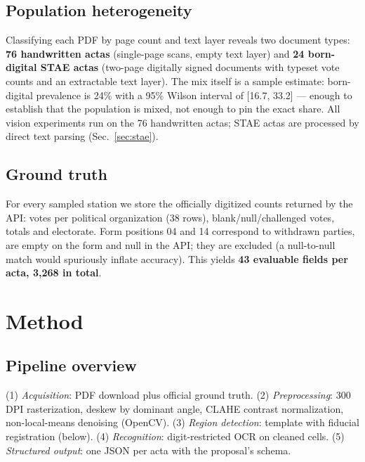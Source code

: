 \documentclass[conference]{IEEEtran}
\begin{document}
\subsection{Population heterogeneity}
Classifying each PDF by page count and text layer reveals two document types:
\textbf{76 handwritten actas} (single-page scans, empty text layer) and
\textbf{24 born-digital STAE actas} (two-page digitally signed documents with
typeset vote counts and an extractable text layer). The mix itself is a
sample estimate: born-digital prevalence is 24\% with a 95\% Wilson interval
of [16.7, 33.2] --- enough to establish that the population is mixed, not
enough to pin the exact share. All vision experiments
run on the 76 handwritten actas; STAE actas are processed by direct text
parsing (Sec.~\ref{sec:stae}).

\subsection{Ground truth}
For every sampled station we store the officially digitized counts returned
by the API: votes per political organization (38 rows), blank/null/challenged
votes, totals and electorate. Form positions 04 and 14 correspond to
withdrawn parties, are empty on the form and null in the API; they are
excluded (a null-to-null match would spuriously inflate accuracy). This
yields \textbf{43 evaluable fields per acta, 3,268 in total}.

\section{Method}
\subsection{Pipeline overview}
(1) \emph{Acquisition}: PDF download plus official ground truth.
(2) \emph{Preprocessing}: 300 DPI rasterization, deskew by dominant angle,
CLAHE contrast normalization, non-local-means denoising (OpenCV).
(3) \emph{Region detection}: template with fiducial registration (below).
(4) \emph{Recognition}: digit-restricted OCR on cleaned cells.
(5) \emph{Structured output}: one JSON per acta with the proposal's schema.
\end{document}
